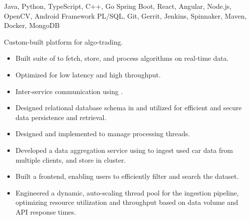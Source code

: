  Java, Python, TypeScript, C++, Go\newline
{} Spring Boot, React, Angular, Node.js, OpenCV, Android Framework\newline
{} PL/SQL, Git, Gerrit, Jenkins, Spinnaker, Maven, Docker, MongoDB\newline


Custom-built platform for algo-trading.
\begin{itemize}
  \item Built  suite of   to fetch, store, and process algorithms on real-time  data.
  \item Optimized for low latency and high throughput.
  \item Inter-service communication using .
  \item Designed relational database schema in  and utilized  for efficient and secure data persistence and retrieval.
  \item Designed and implemented  to manage processing threads.
 \end{itemize}

\begin{itemize}
    \item Developed a data aggregation service using  to ingest used car data from multiple clients, and store in  cluster.
    \item Built a  frontend, enabling users to efficiently filter and search the dataset.
    \item Engineered a dynamic, auto-scaling thread pool for the ingestion pipeline, optimizing resource utilization and throughput based on data volume and API response times.
 \end{itemize}
 

